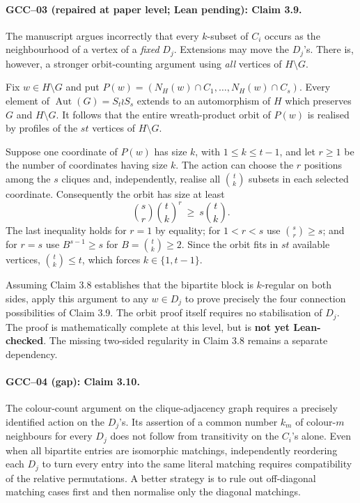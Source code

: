\documentclass[11pt,a4paper]{article}
\begin{document}
\paragraph{GCC--03 (repaired at paper level; Lean pending): Claim 3.9.}
The manuscript argues incorrectly that every \(k\)-subset of \(C_i\)
occurs as the neighbourhood of a vertex of a \emph{fixed} \(D_j\).
Extensions may move the \(D_j\)'s. There is, however, a stronger
orbit-counting argument using \emph{all} vertices of \(H\setminus G\).

Fix \(w\in H\setminus G\) and put
\(P(w)=(N_H(w)\cap C_1,\ldots,N_H(w)\cap C_s)\).
Every element of \(\operatorname{Aut}(G)=S_t\wr S_s\) extends to
an automorphism of \(H\) which preserves \(G\) and \(H\setminus G\).
It follows that the entire wreath-product orbit of \(P(w)\) is
realised by profiles of the \(st\) vertices of \(H\setminus G\).

Suppose one coordinate of \(P(w)\) has size \(k\), with
\(1\leq k\leq t-1\), and let \(r\geq1\) be the number of coordinates
having size \(k\). The action can choose the \(r\) positions among
the \(s\) cliques and, independently, realise all
\(\binom tk\) subsets in each selected coordinate. Consequently
the orbit has size at least
\[
  \binom sr \binom tk^r \ \geq\ s\binom tk.
\]
The last inequality holds for \(r=1\) by equality; for
\(1<r<s\) use \(\binom sr\geq s\);
and for \(r=s\) use \(B^{s-1}\geq s\) for
\(B=\binom tk\geq2\). Since the orbit fits in \(st\)
available vertices, \(\binom tk\leq t\), which forces
\(k\in\{1,t-1\}\).

Assuming Claim 3.8 establishes that the bipartite block is
\(k\)-regular on both sides, apply this argument to any
\(w\in D_j\) to prove precisely the four connection possibilities
of Claim 3.9. The orbit proof itself requires no stabilisation
of \(D_j\). The proof is mathematically complete at this level,
but is \textbf{not yet Lean-checked}. The missing two-sided
regularity in Claim 3.8 remains a separate dependency.

\paragraph{GCC--04 (gap): Claim 3.10.}
The colour-count argument on the clique-adjacency graph requires a
precisely identified action on the \(D_j\)'s. Its assertion of a
common number \(k_m\) of colour-\(m\) neighbours for every \(D_j\)
does not follow from transitivity on the \(C_i\)'s alone.
Even when all bipartite entries are isomorphic matchings,
independently reordering each \(D_j\) to turn every entry into
the same literal matching requires compatibility of the relative
permutations. A better strategy is to rule out off-diagonal
matching cases first and then normalise only the diagonal matchings.
\end{document}
